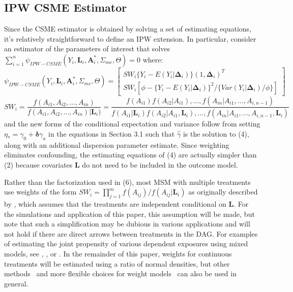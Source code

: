 \documentclass[useAMS,usenatbib,referee]{biom}
\begin{document}
\subsection{IPW CSME Estimator}

Since the CSME estimator is obtained by solving a set of estimating equations, it's relatively straightforward to define an IPW extension. In particular, consider an estimator of the parameters of interest that solves $\sum_{i=1}^{n} \psi_{IPW-CSME}(Y_{i}, \bm{L}_{i}, \bm{A}^{*}_{i}, \Sigma_{me}, \Theta) = 0$ where:
\begin{equation}
    \psi_{IPW-CSME}(Y_{i}, \bm{L}_{i}, \bm{A}^{*}_{i}, \Sigma_{me}, \Theta) =
    \begin{bmatrix}
       SW_{i} \{ Y_{i} - E(Y_{i} | \bm{\Delta}_{i}) \} (1, \bm{\Delta}_{i})^{T} \\
       SW_{i} \left [ \phi - \{ Y_{i} - E(Y_{i} | \bm{\Delta}_{i})\}^{2} / \{ Var(Y_{i} | \bm{\Delta}_{i}) / \phi \} \right ]
    \end{bmatrix}
\end{equation}
\begin{equation}
SW_{i} = \frac{f(A_{i1}, A_{i2}, ..., A_{in})}{f(A_{i1}, A_{i2}, ..., A_{in}) | \bm{L}_{i})} = \frac{f(A_{i1})f(A_{i2} | A_{i1}), ..., f(A_{in} | A_{i1}, ..., A_{i,n-1})}{f(A_{i1} | \bm{L}_{i})f(A_{i2} | A_{i1}, \bm{L}_{i}), ..., f(A_{in} | A_{i1}, ..., A_{i,n-1}, \bm{L}_{i})}
\end{equation}
and the new forms of the conditional expectation and variance follow from setting $\eta_{*} = \gamma_{0} + \bm{\delta}\gamma_{a}$ in the equations in Section 3.1 such that $\hat{\gamma}$ is the solution to (4), along with an additional dispersion parameter estimate. Since weighting eliminates confounding, the estimating equations of (4) are actually simpler than (2) because covariates $\bm{L}$ do not need to be included in the outcome model.

Rather than the factorization used in (6), most MSM with multiple treatments use weights of the form $SW_{i} = \prod_{j=1}^{m} f(A_{ij}) / f(A_{ij} | \bm{L}_{i})$ as originally described by \citet{hernan2001}, which assumes that the treatments are independent conditional on $\bm{L}$. For the simulations and application of this paper, this assumption will be made, but note that such a simplification may be dubious in various applications and will not hold if there are direct arrows between treatments in the DAG. For examples of estimating the joint propensity of various dependent exposures using mixed models, see \citet{tchetgen2012}, \citet{perez2014}, or \citet*{liu2016}. In the remainder of this paper, weights for continuous treatments will be estimated using a ratio of normal densities, but other methods~\citep{hirano2004} and more flexible choices for weight models~\citep{naimi2014} can also be used in general.
\end{document}
